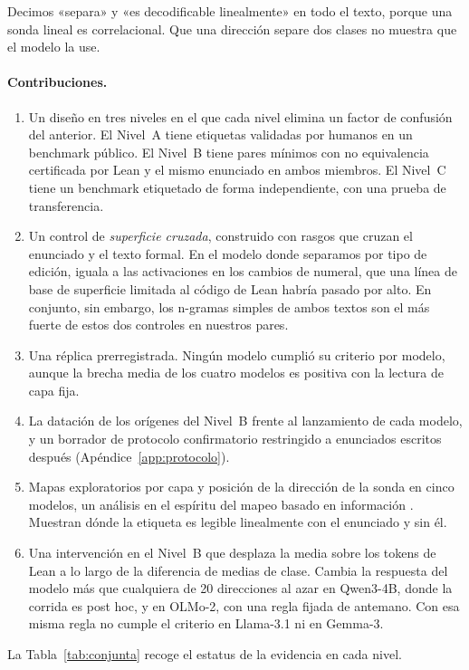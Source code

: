 \documentclass[10pt]{article}
\begin{document}
Decimos «separa» y «es decodificable linealmente» en todo el texto, porque una sonda lineal es correlacional. Que
una dirección separe dos clases no muestra que el modelo la use.

\paragraph{Contribuciones.}
\begin{enumerate}
\item Un diseño en tres niveles en el que cada nivel elimina un factor de confusión del anterior. El Nivel~A tiene
etiquetas validadas por humanos en un benchmark público. El Nivel~B tiene pares mínimos con no equivalencia
certificada por Lean y el mismo enunciado en ambos miembros. El Nivel~C tiene un benchmark etiquetado de forma
independiente, con una prueba de transferencia.
\item Un control de \emph{superficie cruzada}, construido con rasgos que cruzan el enunciado y el texto formal. En el
modelo donde separamos por tipo de edición, iguala a las activaciones en los cambios de numeral, que una línea de
base de superficie limitada al código de Lean habría pasado por alto. En conjunto, sin embargo, los n-gramas simples de ambos
textos son el más fuerte de estos dos controles en nuestros pares.
\item Una réplica prerregistrada. Ningún modelo cumplió su criterio por modelo, aunque la brecha media de los cuatro
modelos es positiva con la lectura de capa fija.
\item La datación de los orígenes del Nivel~B frente al lanzamiento de cada modelo, y un borrador de protocolo
confirmatorio restringido a enunciados escritos después (Apéndice~\ref{app:protocolo}).
\item Mapas exploratorios por capa y posición de la dirección de la sonda en cinco modelos, un análisis en el
espíritu del mapeo basado en información \citep{searchlight}. Muestran dónde la etiqueta es legible linealmente con
el enunciado y sin él.
\item Una intervención en el Nivel~B que desplaza la media sobre los tokens de Lean a lo largo de la diferencia de
medias de clase. Cambia la respuesta del modelo más que cualquiera de 20 direcciones al azar en Qwen3-4B, donde la corrida es post
hoc, y en OLMo-2, con una regla fijada de antemano. Con esa misma regla no cumple el criterio en Llama-3.1 ni en
Gemma-3.
\end{enumerate}

La Tabla~\ref{tab:conjunta} recoge el estatus de la evidencia en cada nivel.
\end{document}

